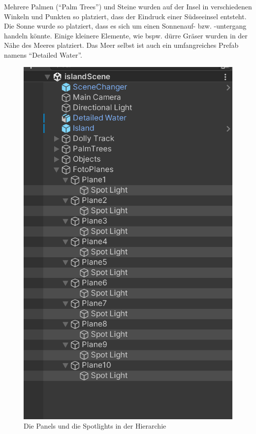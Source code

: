 Mehrere Palmen (``Palm Trees'') und Steine wurden auf der Insel in verschiedenen Winkeln und Punkten so platziert, dass der Eindruck einer Südseeinsel entsteht. Die Sonne wurde so platziert, dass es sich um einen Sonnenauf- bzw. -untergang handeln könnte. Einige kleinere Elemente, wie bspw. dürre Gräser wurden in der Nähe des Meeres platziert. Das Meer selbst ist auch ein umfangreiches Prefab namens ``Detailed Water''. 


\begin{figure}
    \centering
    \includegraphics[scale=0.15]{pics/unity-island-light-setting.png}
    \caption{Die Panels und die Spotlights in der Hierarchie}
    \label{fig:unity-island-light-setting}


\end{figure}
